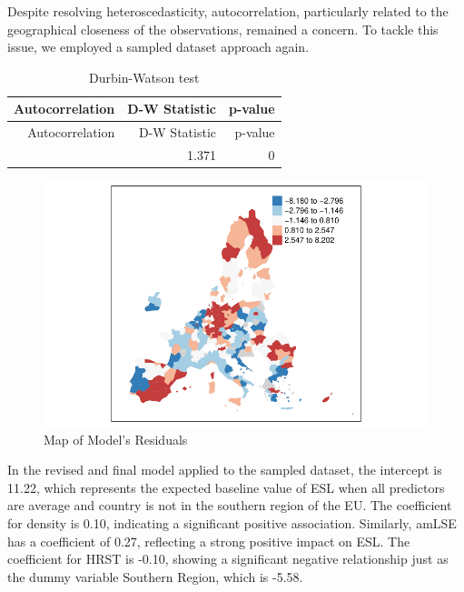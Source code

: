 \documentclass[
  letterpaper,
  DIV=11,
  numbers=noendperiod,
  abstract]{scrartcl}
\begin{document}
Despite resolving heteroscedasticity, autocorrelation, particularly
related to the geographical closeness of the observations, remained a
concern. To tackle this issue, we employed a sampled dataset approach
again.

\begin{longtable}[]{@{}rrr@{}}
\caption{Durbin-Watson test}\tabularnewline
\toprule\noalign{}
Autocorrelation & D-W Statistic & p-value \\
\midrule\noalign{}
\endfirsthead
\toprule\noalign{}
Autocorrelation & D-W Statistic & p-value \\
\midrule\noalign{}
\endhead
\bottomrule\noalign{}
\endlastfoot
0.314 & 1.371 & 0 \\
\end{longtable}

\begin{figure}[H]

{\centering \includegraphics{report_files/figure-pdf/redis_map_sel-1.pdf}

}

\caption{Map of Model's Residuals}

\end{figure}%

In the revised and final model applied to the sampled dataset, the
intercept is 11.22, which represents the expected baseline value of ESL
when all predictors are average and country is not in the southern
region of the EU. The coefficient for density is 0.10, indicating a
significant positive association. Similarly, amLSE has a coefficient of
0.27, reflecting a strong positive impact on ESL. The coefficient for
HRST is -0.10, showing a significant negative relationship just as the
dummy variable Southern Region, which is -5.58.
\end{document}
